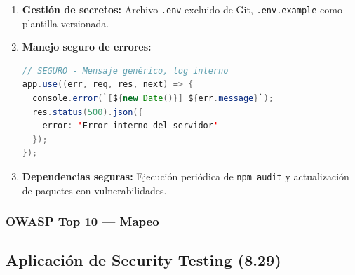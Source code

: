 \begin{enumerate}
    \item \textbf{Gestión de secretos:} Archivo \texttt{.env} excluido de Git, \texttt{.env.example} como plantilla versionada.

    \item \textbf{Manejo seguro de errores:}

    \begin{lstlisting}[language=Java, caption={Manejo seguro de errores}]
// SEGURO - Mensaje genérico, log interno
app.use((err, req, res, next) => {
  console.error(`[${new Date()}] ${err.message}`);
  res.status(500).json({
    error: 'Error interno del servidor'
  });
});
    \end{lstlisting}

    \item \textbf{Dependencias seguras:} Ejecución periódica de \texttt{npm audit} y actualización de paquetes con vulnerabilidades.
\end{enumerate}

\subsubsection{OWASP Top 10 --- Mapeo}

\begin{table}[h]
\centering
\small
{}
\caption{Mapeo OWASP Top 10 a Workcodile-dev}
\label{tab:owasp-workcodile}
\end{table}

\subsection{Aplicación de Security Testing (8.29)}

